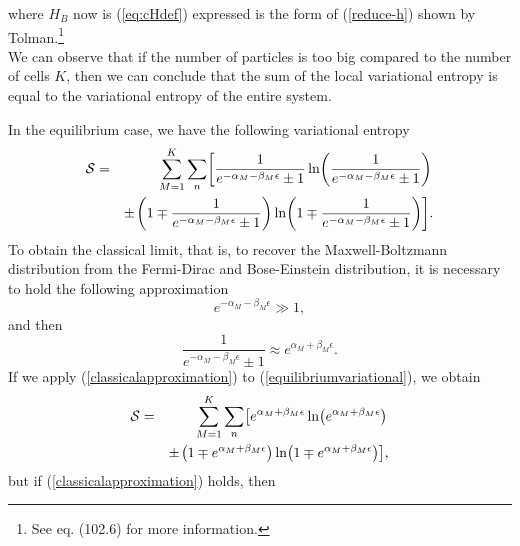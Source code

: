 where $H_{B}$ now is (\ref{eq:cHdef}) expressed is the form of (\ref{reduce-h}) shown by Tolman.\footnote{See \cite{bib:tolman} eq. (102.6) for more information.}\\
We can observe that if the number of particles is too big compared to the number of cells $K$, then we can conclude that the sum of the local variational entropy is equal to the variational entropy of the entire system.

In the equilibrium case, we have the following variational entropy
\begin{eqnarray}
    \Ss&=& \sum_{M=1}^{K}\sum_{n}
        \left[
                \frac{1}{e^{-\alpha_M-\beta_M \epsilon}\pm 1} \ln 
                    \left(
                            \frac{1}{e^{-\alpha_M-\beta_M \epsilon}\pm 1}
                    \right)
        \right. \nonumber \\
          && \pm \left. \left(
                        1 \mp \frac{1}{e^{-\alpha_M-\beta_M \epsilon}\pm 1}
                  \right) \ln
                \left(
                        1 \mp \frac{1}{e^{-\alpha_M-\beta_M \epsilon}\pm 1}            
                \right) \right]. \label{equilibriumvariational}
\end{eqnarray}
To obtain the classical limit, that is, to recover the Maxwell-Boltzmann distribution from the Fermi-Dirac and Bose-Einstein distribution, it is necessary to hold the following approximation
\begin{equation}
    e^{-\alpha_M-\beta_M \epsilon}\gg 1, \label{classicalapproximation}
\end{equation}
and then
\begin{equation}
    \frac{1}{e^{-\alpha_M-\beta_M \epsilon}\pm 1} \approx e^{\alpha_M+\beta_M \epsilon}.
\end{equation}
If we apply (\ref{classicalapproximation}) to (\ref{equilibriumvariational}), we obtain
\begin{eqnarray}
    \Ss&=& \sum_{M=1}^{K}\sum_{n}
        \left[
                e^{\alpha_M+\beta_M \epsilon} \ln 
                    \left(
                            e^{\alpha_M+\beta_M \epsilon}
                    \right)
        \right. \nonumber \\
          && \pm \left. \left(
                        1 \mp e^{\alpha_M+\beta_M \epsilon}
                  \right) \ln
                \left(
                        1 \mp e^{\alpha_M+\beta_M \epsilon}            
                \right) \right],
\end{eqnarray}
but if (\ref{classicalapproximation}) holds, then 
